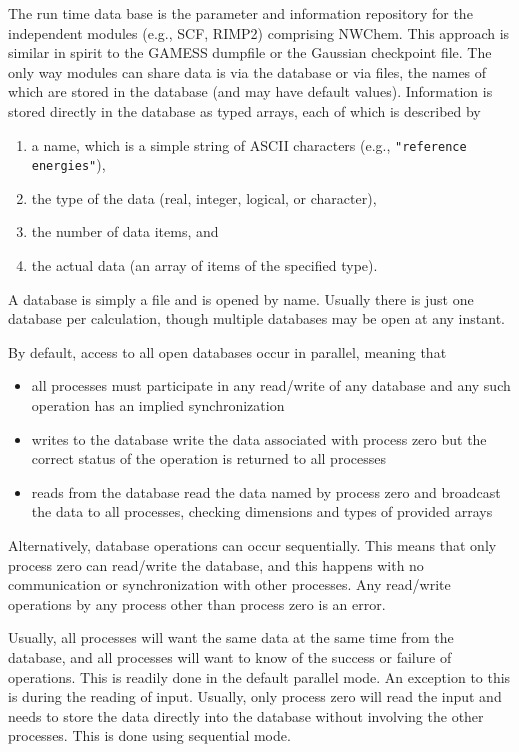 \label{sec:rtdb}

The run time data base is the parameter and information repository for
the independent modules (e.g., SCF, RIMP2) comprising NWChem.
This approach is similar in spirit to the GAMESS
dumpfile or the Gaussian checkpoint file.  The only way modules can
share data is via the database or via files, the names of which are stored in
the database (and may have default values).  Information is stored
directly in the database as typed arrays, each of which is described by
\begin{enumerate}
\item a name, which is a simple string of ASCII characters (e.g., 
      \verb+"reference energies"+),
\item the type of the data (real, integer, logical, or character), 
\item the number of data items, and
\item the actual data (an array of items of the specified type).
\end{enumerate}

A database is simply a file and is opened by name. Usually there is
just one database per calculation, though multiple databases may be
open at any instant.  

By default, access to all open databases occur in parallel, meaning
that
\begin{itemize}
\item all processes must participate in any read/write of any database
  and any such operation has an implied synchronization
\item writes to the database write the data associated with process
  zero but the correct status of the operation is returned to all
  processes
\item reads from the database read the data named by process zero and
  broadcast the data to all processes, checking dimensions and types
  of provided arrays
\end{itemize}

Alternatively, database operations can occur sequentially.  This means
that
only process zero can read/write the database, and this happens
  with no communication or synchronization with other processes.
Any read/write operations by any process other than process zero is
  an error.

Usually, all processes will want the same data at the same time from
the database, and all processes will want to know of the success or
failure of operations.  This is readily done in the default parallel
mode.  An exception to this is during the reading of input.
Usually, only process zero will read the input and needs to store the
data directly into the database without involving the other processes.
This is done using sequential mode.

